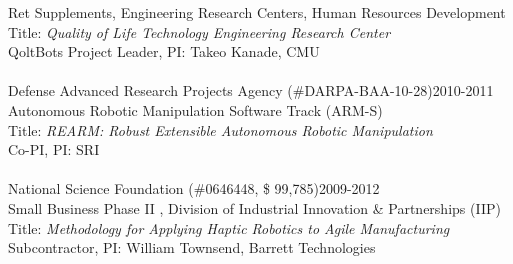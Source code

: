 \documentclass[10pt]{article}
\begin{document}
Ret Supplements, Engineering Research Centers, Human Resources Development\\
Title: \textit{Quality of Life Technology Engineering Research Center}\\
QoltBots Project Leader, PI: Takeo Kanade, CMU\\
\\
Defense Advanced Research Projects Agency (\#DARPA-BAA-10-28)\hfill 2010-2011\\
Autonomous Robotic Manipulation Software Track (ARM-S)\\
Title: \textit{REARM: Robust Extensible Autonomous Robotic Manipulation}\\
Co-PI, PI: SRI\\
\\
National Science Foundation (\#0646448, \$ 99,785)\hfill 2009-2012\\
Small Business Phase II , Division of Industrial Innovation \& Partnerships (IIP)\\
Title: \textit{Methodology for Applying Haptic Robotics to Agile Manufacturing}\\
Subcontractor, PI: William Townsend, Barrett Technologies\\
\end{document}
